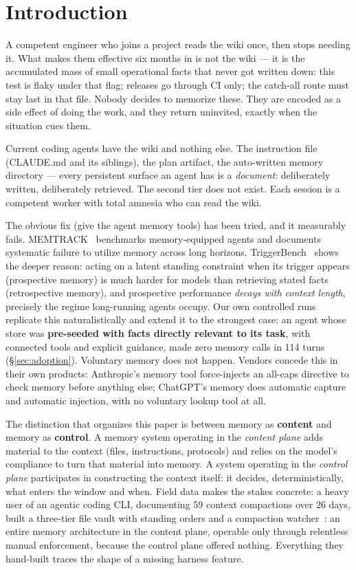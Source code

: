 \documentclass[11pt]{article}
\begin{document}
\section{Introduction}
\label{sec:intro}

A competent engineer who joins a project reads the wiki once, then stops
needing it. What makes them effective six months in is not the wiki --- it
is the accumulated mass of small operational facts that never got written
down: this test is flaky under that flag; releases go through CI only; the
catch-all route must stay last in that file. Nobody decides to memorize
these. They are encoded as a side effect of doing the work, and they
return uninvited, exactly when the situation cues them.

Current coding agents have the wiki and nothing else. The instruction file
(CLAUDE.md and its siblings), the plan artifact, the auto-written memory
directory --- every persistent surface an agent has is a \emph{document}:
deliberately written, deliberately retrieved. The second tier does not
exist. Each session is a competent worker with total amnesia who can read
the wiki.

The obvious fix (give the agent memory tools) has been tried, and it
measurably fails. MEMTRACK~\cite{memtrack} benchmarks memory-equipped agents and
documents systematic failure to utilize memory across long horizons.
TriggerBench~\cite{triggerbench} shows the deeper reason: acting on a latent
standing constraint when its trigger appears (prospective memory) is much
harder for models than retrieving stated facts (retrospective memory), and
prospective performance \emph{decays with context length}, precisely the
regime long-running agents occupy. Our own controlled runs replicate this
naturalistically and extend it to the strongest case: an agent whose store
was \textbf{pre-seeded with facts directly relevant to its task}, with
connected tools and explicit guidance, made zero memory calls in 114 turns
(\S\ref{sec:adoption}). Voluntary memory does not happen. Vendors concede this in their
own products: Anthropic's memory tool force-injects an all-caps directive
to check memory before anything else; ChatGPT's memory does automatic
capture and automatic injection, with no voluntary lookup tool at all.

The distinction that organizes this paper is between memory as \textbf{content}
and memory as \textbf{control}. A memory system operating in the \emph{content
plane} adds material to the context (files, instructions, protocols)
and relies on the model's compliance to turn that material into memory. A
system operating in the \emph{control plane} participates in constructing the
context itself: it decides, deterministically, what enters the window and
when. Field data makes the stakes concrete: a heavy user of an agentic
coding CLI, documenting 59 context compactions over 26 days, built a
three-tier file vault with standing orders and a compaction watcher~\cite{fieldreport}:
an entire memory architecture in the content plane, operable only
through relentless manual enforcement, because the control plane offered
nothing. Everything they hand-built traces the shape of a missing harness
feature.
\end{document}
